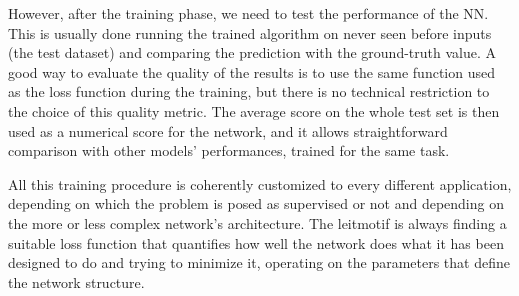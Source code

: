 However, after the training phase, we need to test the performance of the NN. This is usually done running the trained algorithm on never seen before inputs (the test dataset) and comparing the prediction with the ground-truth value. A good way to evaluate the quality of the results is to use the same function used as the loss function during the training, but there is no technical restriction to the choice of this quality metric. The average score on the whole test set is then used as a numerical score for the network, and it allows straightforward comparison with other models' performances, trained for the same task.

All this training procedure is coherently customized to every different application, depending on which the problem is posed as supervised or not and depending on the more or less complex network's architecture. The leitmotif is always finding a suitable loss function that quantifies how well the network does what it has been designed to do and trying to minimize it, operating on the parameters that define the network structure.

\clearpage
